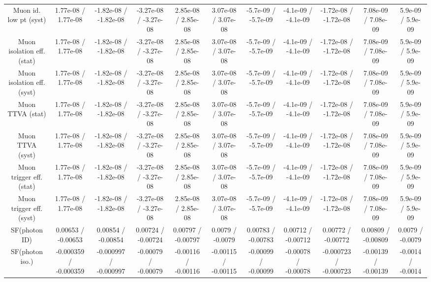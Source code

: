 \begin{table}[htbp]
\begin{center}
\begin{tabular}{|c|c|c|c|c|c|c|c|c|c|c|}
  Muon id. low pt (syst) & 1.77e-08 / 1.77e-08 & -1.82e-08 / -1.82e-08 & -3.27e-08 / -3.27e-08 & 2.85e-08 / 2.85e-08 & 3.07e-08 / 3.07e-08 & -5.7e-09 / -5.7e-09 & -4.1e-09 / -4.1e-09 & -1.72e-08 / -1.72e-08 & 7.08e-09 / 7.08e-09 & 5.9e-09 / 5.9e-09 \\ 
  Muon isolation eff. (stat) & 1.77e-08 / 1.77e-08 & -1.82e-08 / -1.82e-08 & -3.27e-08 / -3.27e-08 & 2.85e-08 / 2.85e-08 & 3.07e-08 / 3.07e-08 & -5.7e-09 / -5.7e-09 & -4.1e-09 / -4.1e-09 & -1.72e-08 / -1.72e-08 & 7.08e-09 / 7.08e-09 & 5.9e-09 / 5.9e-09 \\ 
  Muon isolation eff. (syst) & 1.77e-08 / 1.77e-08 & -1.82e-08 / -1.82e-08 & -3.27e-08 / -3.27e-08 & 2.85e-08 / 2.85e-08 & 3.07e-08 / 3.07e-08 & -5.7e-09 / -5.7e-09 & -4.1e-09 / -4.1e-09 & -1.72e-08 / -1.72e-08 & 7.08e-09 / 7.08e-09 & 5.9e-09 / 5.9e-09 \\ 
  Muon TTVA (stat) & 1.77e-08 / 1.77e-08 & -1.82e-08 / -1.82e-08 & -3.27e-08 / -3.27e-08 & 2.85e-08 / 2.85e-08 & 3.07e-08 / 3.07e-08 & -5.7e-09 / -5.7e-09 & -4.1e-09 / -4.1e-09 & -1.72e-08 / -1.72e-08 & 7.08e-09 / 7.08e-09 & 5.9e-09 / 5.9e-09 \\ 
  Muon TTVA (syst) & 1.77e-08 / 1.77e-08 & -1.82e-08 / -1.82e-08 & -3.27e-08 / -3.27e-08 & 2.85e-08 / 2.85e-08 & 3.07e-08 / 3.07e-08 & -5.7e-09 / -5.7e-09 & -4.1e-09 / -4.1e-09 & -1.72e-08 / -1.72e-08 & 7.08e-09 / 7.08e-09 & 5.9e-09 / 5.9e-09 \\ 
  Muon trigger eff. (stat) & 1.77e-08 / 1.77e-08 & -1.82e-08 / -1.82e-08 & -3.27e-08 / -3.27e-08 & 2.85e-08 / 2.85e-08 & 3.07e-08 / 3.07e-08 & -5.7e-09 / -5.7e-09 & -4.1e-09 / -4.1e-09 & -1.72e-08 / -1.72e-08 & 7.08e-09 / 7.08e-09 & 5.9e-09 / 5.9e-09 \\ 
  Muon trigger eff. (syst) & 1.77e-08 / 1.77e-08 & -1.82e-08 / -1.82e-08 & -3.27e-08 / -3.27e-08 & 2.85e-08 / 2.85e-08 & 3.07e-08 / 3.07e-08 & -5.7e-09 / -5.7e-09 & -4.1e-09 / -4.1e-09 & -1.72e-08 / -1.72e-08 & 7.08e-09 / 7.08e-09 & 5.9e-09 / 5.9e-09 \\ 
  SF(photon ID) & 0.00653 / -0.00653 & 0.00854 / -0.00854 & 0.00724 / -0.00724 & 0.00797 / -0.00797 & 0.0079 / -0.0079 & 0.00783 / -0.00783 & 0.00712 / -0.00712 & 0.00772 / -0.00772 & 0.00809 / -0.00809 & 0.0079 / -0.0079 \\ 
  SF(photon iso.) & -0.000359 / -0.000359 & -0.000997 / -0.000997 & -0.00079 / -0.00079 & -0.00116 / -0.00116 & -0.00115 / -0.00115 & -0.00099 / -0.00099 & -0.00078 / -0.00078 & -0.000723 / -0.000723 & -0.00139 / -0.00139 & -0.0014 / -0.0014 \\ 

\end{tabular}
\end{center}
\end{table}
